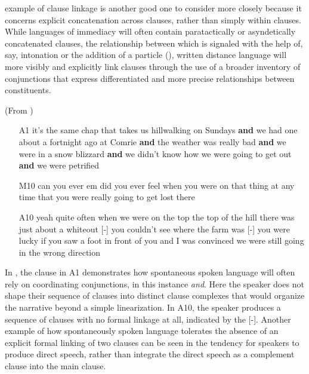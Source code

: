  example of clause linkage is another good one to consider more closely because it concerns explicit concatenation across clauses, rather than simply within clauses. While languages of immediacy will often contain paratactically or asyndetically concatenated clauses, the relationship between which is signaled with the help of, say, intonation or the addition of a particle (\citealt[23]{MillerWeinert1998}), written distance language will more visibly and explicitly link clauses through the use of a broader inventory of conjunctions that express differentiated and more precise relationships between constituents.

\ea%
    \label{ex:4:4}(From \citet[103]{MillerWeinert1998})\\
\begin{itemize}
\item[A1]    it’s the same chap that takes us hillwalking on Sundays \textbf{and} we had one about a fortnight ago at Comrie \textbf{and} the weather was really bad \textbf{and} we were in a snow blizzard \textbf{and} we didn’t know how we were going to get out \textbf{and} we were petrified
\item[M10]    can you ever em did you ever feel when you were on that thing at any time that you were really going to get lost there
\item[A10]   yeah quite often when we were on the top the top of the hill there was just about a whiteout [-] you couldn’t see where the farm was [-] you were lucky if you saw a foot in front of you and I was convinced we were still going in the wrong direction
\end{itemize}
    \z

\noindent In , the clause in A1 demonstrates how spontaneous spoken language will often rely on coordinating conjunctions, in this instance \textit{and}. Here the speaker does not shape their sequence of clauses into distinct clause complexes that would organize the narrative beyond a simple linearization. In A10, the speaker produces a sequence of clauses with no formal linkage at all, indicated by the [-]. Another example of how spontaneously spoken language tolerates the absence of an explicit formal linking of two clauses can be seen in the tendency for speakers to produce direct speech, rather than integrate the direct speech as a complement clause into the main clause.

